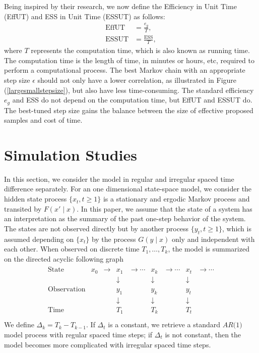 Being inspired by their research, we now define the Efficiency in Unit Time (EffUT)  and ESS in Unit Time (ESSUT) as follows: 
\begin{align}
\mbox{EffUT}     &= \frac{e_g}{T},\\
\mbox{ESSUT} &= \frac{\mbox{ESS}}{T},
\end{align} 
where $T$ represents the computation time, which is also known as running time. The computation time is the length of time, in minutes or hours, etc, required to perform a computational process. The best Markov chain with an appropriate step size $\epsilon$ should not only have a lower correlation, as illustrated in Figure (\ref{largesmallstepsize}), but also have less time-consuming. The standard efficiency $e_g$ and ESS do not depend on the computation time, but EffUT and ESSUT do. The best-tuned step size gains the balance between the size of effective proposed samples and cost of time. 




\section{Simulation Studies}

In this section, we consider the model in regular and irregular spaced time difference separately. For an one dimensional state-space model, we consider the hidden state process $\{x_t, t\geq 1\}$ is a stationary and ergodic Markov process and transited by $F(x'\mid x)$. In this paper, we assume that the state of a system has an interpretation as the summary of the past one-step behavior of the system. The states are not observed directly but by another process $\{y_t, t\geq 1\}$, which is assumed depending on $\{x_t\}$ by the process $G(y\mid x)$ only and independent with each other. When observed on discrete time $T_1,\dots,T_k$, the model is summarized on the directed acyclic following graph  
\begin{align*}
\begin{matrix}
\mbox{State}  & x_0     &  \rightarrow& x_1   & \rightarrow \cdots  & x_k  & \rightarrow \cdots & x_t & \rightarrow \cdots\\
          & &       & \downarrow &         &\downarrow &        &\downarrow &   \\
\mbox{Observation}& && y_1               &          & y_k               &        & y_t               &   \\
          & &      & \downarrow &          &\downarrow  &        &\downarrow &   \\
\mbox{Time } & &       & T_1               &          & T_k               &        & T_t               &   \\
\end{matrix}
\end{align*}
We define $\Delta_k = T_k-T_{k-1}$. If $\Delta_t$ is a constant, we retrieve a standard  $\textit{AR(1)}$ model process with regular spaced time steps; if $\Delta_t$ is not constant, then the model becomes more complicated with irregular spaced time steps. 

